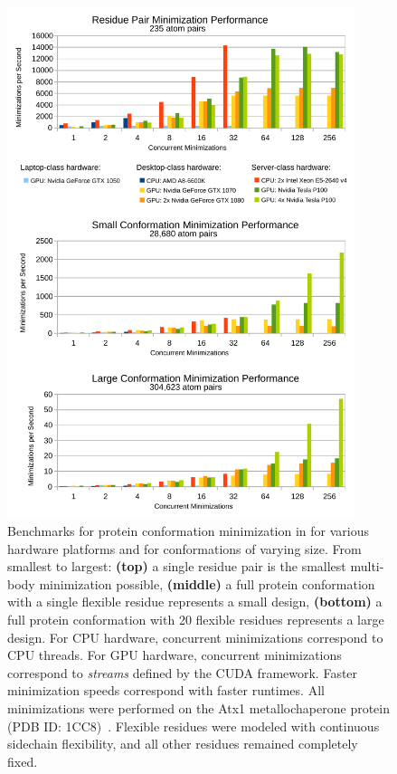 \begin{figure}
\center
\includegraphics[width=4in]{figures/gpu.pdf}
\caption{Benchmarks for protein conformation minimization in  for various hardware platforms and for conformations of varying size. From smallest to largest: {\bf (top)} a single residue pair is the smallest multi-body minimization possible, {\bf (middle)} a full protein conformation with a single flexible residue represents a small design, {\bf (bottom)} a full protein conformation with 20 flexible residues represents a large design. For CPU hardware, concurrent minimizations correspond to CPU threads. For GPU hardware, concurrent minimizations correspond to {\it streams} defined by the CUDA framework. Faster minimization speeds correspond with faster \osprey runtimes. All minimizations were performed on the Atx1 metallochaperone protein (PDB ID: 1CC8)~\cite{1CC8}. Flexible residues were modeled with continuous sidechain flexibility, and all other residues remained completely fixed.}
\label{fig:gpu}
\end{figure}

